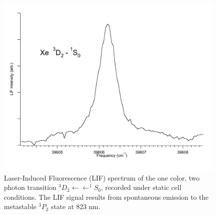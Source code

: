 \documentclass[12pt]{mitthesis}
\begin{document}
\begin{figure}
  \caption{Laser-Induced Fluorescence (LIF) spectrum of the one color,
    two photon transition  $^3D_2 \leftarrow \leftarrow
    ^1S_0$, recorded under static cell conditions.  The LIF signal
    results from spontaneous emission to the metastable $^3P_2$
    state at 823 nm.}
  \label{fig:xe3d2-cell}
  \centering
  \vspace{1cm}
  \includegraphics[width=6in]{Xe3D2-cell.pdf}
  \vspace{3cm}
\end{figure}
\end{document}
